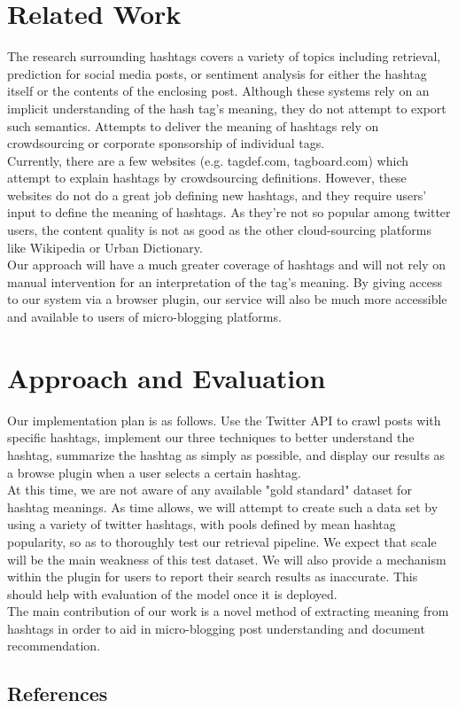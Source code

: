 \documentclass{sig-alternate}
\begin{document}
\section{Related Work}
The research surrounding hashtags covers a variety of topics including retrieval\cite{efron:retrieval}, prediction\cite{khabiri:predict}\cite{fbtagspace} for social media posts, or sentiment analysis for either the hashtag itself or the contents of the enclosing post.  Although these systems rely on an implicit understanding of the hash tag's meaning, they do not attempt to export such semantics.  Attempts to deliver the meaning of hashtags rely on crowdsourcing or corporate sponsorship of individual tags.\\
Currently, there are a few websites (e.g. tagdef.com, tagboard.com) which attempt to explain hashtags by crowdsourcing definitions. However, these websites do not do a great job defining new hashtags, and they require users’ input to define the meaning of hashtags. As they’re not so popular among twitter users, the content quality is not as good as the other cloud-sourcing platforms like Wikipedia or Urban Dictionary.\\
Our approach will have a much greater coverage of hashtags and will not rely on manual intervention for an interpretation of the tag's meaning.  By giving access to our system via a browser plugin, our service will also be much more accessible and available to users of micro-blogging platforms.\\

\section{Approach and Evaluation}
Our implementation plan is as follows. Use the Twitter API to crawl posts with specific hashtags, implement our three techniques to better understand the hashtag, summarize the hashtag as simply as possible, and display our results as a browse plugin when a user selects a certain hashtag.\\
  At this time, we are not aware of any available "gold standard" dataset for hashtag meanings.  As time allows, we will attempt to create such a data set by using a variety of twitter hashtags, with pools defined by mean hashtag popularity, so as to thoroughly test our retrieval pipeline.  We expect that scale will be the main weakness of this test dataset.  We will also provide a mechanism within the plugin for users to report their search results as inaccurate.  This should help with evaluation of the model once it is deployed.\\
The main contribution of our work is a novel method of extracting meaning from hashtags in order to aid in micro-blogging post understanding and document recommendation.\\

\subsection{References}
\end{document}

